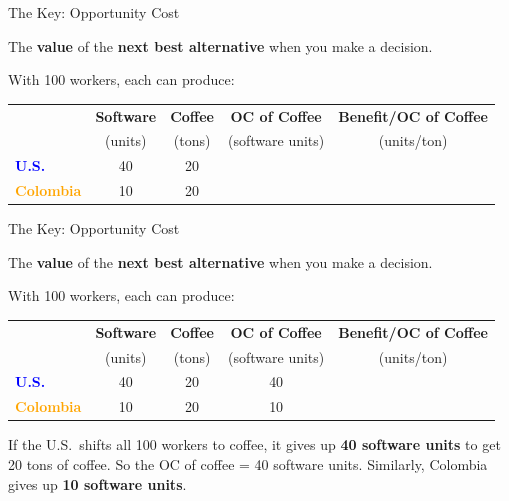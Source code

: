 \documentclass[9pt,english,aspectratio=169]{beamer}
\begin{document}
\begin{frame}{The Key: Opportunity Cost}

  \begin{definitionbox}
    The \textbf{value} of the \textbf{next best alternative} when you make a decision.
  \end{definitionbox}

  \vspace{1em}
  \centering
  {\small With 100 workers, each can produce:}

  \vspace{0.8em}
  \begin{tabular}{@{} l c c c c @{}}
    \toprule
    & \textbf{Software} & \textbf{Coffee} & \textbf{OC of Coffee} & \textbf{Benefit/OC of Coffee} \\
    & (units) & (tons) & (software units) & (units/ton) \\
    \midrule
    \textcolor{blue}{\textbf{U.S.}} & 40 & 20 & & \\
    \textcolor{orange}{\textbf{Colombia}} & 10 & 20 & & \\
    \bottomrule
  \end{tabular}

\end{frame}

\begin{frame}{The Key: Opportunity Cost}

  \begin{definitionbox}
    The \textbf{value} of the \textbf{next best alternative} when you make a decision.
  \end{definitionbox}

  \vspace{1em}
  \centering
  {\small With 100 workers, each can produce:}

  \vspace{0.8em}
  \begin{tabular}{@{} l c c c c @{}}
    \toprule
    & \textbf{Software} & \textbf{Coffee} & \textbf{OC of Coffee} & \textbf{Benefit/OC of Coffee} \\
    & (units) & (tons) & (software units) & (units/ton) \\
    \midrule
    \textcolor{blue}{\textbf{U.S.}} & 40 & 20 & 40 & \\
    \textcolor{orange}{\textbf{Colombia}} & 10 & 20 & 10 & \\
    \bottomrule
  \end{tabular}

  \vspace{0.8em}
  If the U.S.\ shifts all 100 workers to coffee, it gives up \textbf{40 software units} to get 20 tons of coffee. So the OC of coffee = 40 software units. Similarly, Colombia gives up \textbf{10 software units}.

\end{frame}
\end{document}
